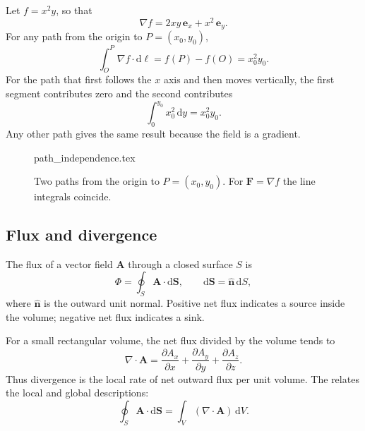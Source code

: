 \begin{example}
Let $f=x^2y$, so that
\begin{equation}
\nabla f=2xy\,\mathbf{e}_x+x^2\,\mathbf{e}_y.
\end{equation}
For any path from the origin to $P=(x_0,y_0)$,
\begin{equation}
\int_O^P\nabla f\cdot\mathrm{d}\boldsymbol{\ell}
=f(P)-f(O)=x_0^2y_0.
\end{equation}
For the path that first follows the $x$ axis and then moves vertically, the first segment contributes zero and the second contributes
\begin{equation}
\int_0^{y_0}x_0^2\,\mathrm{d}y=x_0^2y_0.
\end{equation}
Any other path gives the same result because the field is a gradient.
\end{example}

\begin{figure}[htb]
    \centering
    {path_independence.tex}
    \caption{Two paths from the origin to $P=(x_0,y_0)$. For $\mathbf{F}=\nabla f$ the line integrals coincide.}
    \label{fig:vec-path}
\end{figure}

\subsection{Flux and divergence}
The flux of a vector field $\mathbf{A}$ through a closed surface $S$ is
\begin{equation}
\Phi=\oint_S\mathbf{A}\cdot\mathrm{d}\mathbf{S},
\qquad
\mathrm{d}\mathbf{S}=\hat{\mathbf{n}}\,\mathrm{d}S,
\end{equation}
where $\hat{\mathbf{n}}$ is the outward unit normal. Positive net flux indicates a source inside the volume; negative net flux indicates a sink.

For a small rectangular volume, the net flux divided by the volume tends to
\begin{equation}
\nabla\cdot\mathbf{A}
=\frac{\partial A_x}{\partial x}
+\frac{\partial A_y}{\partial y}
+\frac{\partial A_z}{\partial z}.
\end{equation}
Thus divergence is the local rate of net outward flux per unit volume. The  relates the local and global descriptions:
\begin{equation}
\oint_S\mathbf{A}\cdot\mathrm{d}\mathbf{S}
=\int_V(\nabla\cdot\mathbf{A})\,\mathrm{d}V.
\end{equation}

